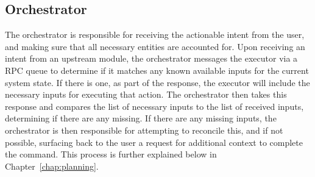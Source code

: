 \subsection{Orchestrator}

The orchestrator is responsible for receiving the actionable intent from the user, 
and making sure that all necessary entities are accounted for. Upon receiving an 
intent from an upstream module, the orchestrator messages the executor via a RPC 
queue to determine if it
matches any known available inputs for the current system state. If there is one,
as part of the response, the executor will include the necessary inputs for
executing that action. The orchestrator
then takes this response and compares the list of necessary inputs to the list of 
received inputs, determining if there are any missing. If there are any missing 
inputs, the orchestrator is then responsible for attempting to reconcile this,
and if not possible, surfacing back to the user a request for additional context
to complete the command. This process is further explained below in  
Chapter~\ref{chap:planning}.
